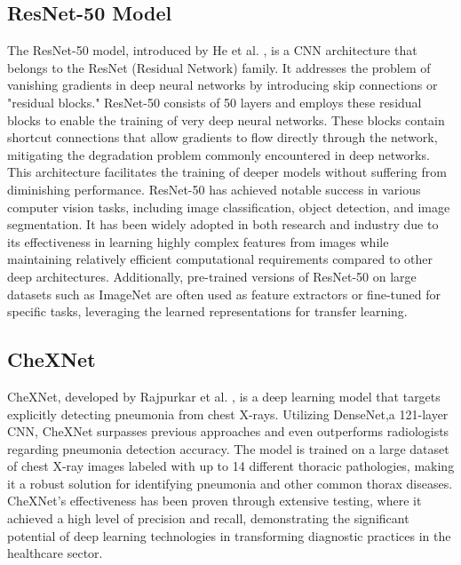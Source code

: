 \subsection{ResNet-50 Model}
The ResNet-50 model, introduced by He et al. \cite{He2016} \cite{Manickam2021}, is a CNN architecture that belongs to the ResNet (Residual Network) family. It addresses the problem of vanishing gradients in deep neural networks by introducing skip connections or "residual blocks." ResNet-50 consists of 50 layers and employs these residual blocks to enable the training of very deep neural networks. These blocks contain shortcut connections that allow gradients to flow directly through the network, mitigating the degradation problem commonly encountered in deep networks. This architecture facilitates the training of deeper models without suffering from diminishing performance. ResNet-50 has achieved notable success in various computer vision tasks, including image classification, object detection, and image segmentation. It has been widely adopted in both research and industry due to its effectiveness in learning highly complex features from images while maintaining relatively efficient computational requirements compared to other deep architectures. Additionally, pre-trained versions of ResNet-50 on large datasets such as ImageNet are often used as feature extractors or fine-tuned for specific tasks, leveraging the learned representations for transfer learning.

\subsection{CheXNet}
CheXNet, developed by Rajpurkar et al. \cite{Rajpurkar2017}, is a deep learning model that targets explicitly detecting pneumonia from chest X-rays. Utilizing DenseNet,a 121-layer CNN, CheXNet surpasses previous approaches and even outperforms radiologists regarding pneumonia detection accuracy. The model is trained on a large dataset of chest X-ray images labeled with up to 14 different thoracic pathologies, making it a robust solution for identifying pneumonia and other common thorax diseases. CheXNet's effectiveness has been proven through extensive testing, where it achieved a high level of precision and recall, demonstrating the significant potential of deep learning technologies in transforming diagnostic practices in the healthcare sector.

